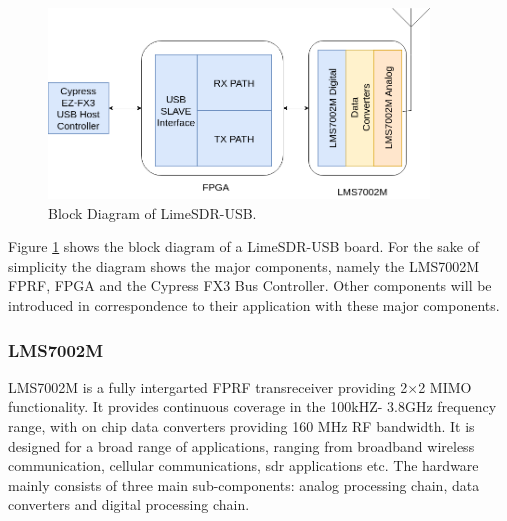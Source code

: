 \begin{figure}[h!]
\centering
\includegraphics[width=0.9\textwidth]{Figure/Lime_Hardware.png}
\caption{Block Diagram of LimeSDR-USB.}
\label{lime_hw_arch}
\end{figure}

Figure \ref{lime_hw_arch} shows the block diagram of a LimeSDR-USB board.
For the sake of simplicity the diagram shows the major components, namely the LMS7002M \ac{FPRF}, \ac{FPGA} and the Cypress FX3 Bus Controller.
Other components will be introduced in correspondence to their application with these major components.

\subsubsection{LMS7002M} 

LMS7002M is a fully intergarted \ac{FPRF} transreceiver providing 2$\times$2 \ac{MIMO} functionality.
It provides continuous coverage in the 100kHZ- 3.8GHz frequency range, with on chip data converters providing 160 MHz \ac{RF} bandwidth.
It is designed for a broad range of applications, ranging from broadband wireless communication, cellular communications, \ac{sdr} applications etc.
The hardware mainly consists of three main sub-components: analog processing chain, data converters and digital processing chain.\\

